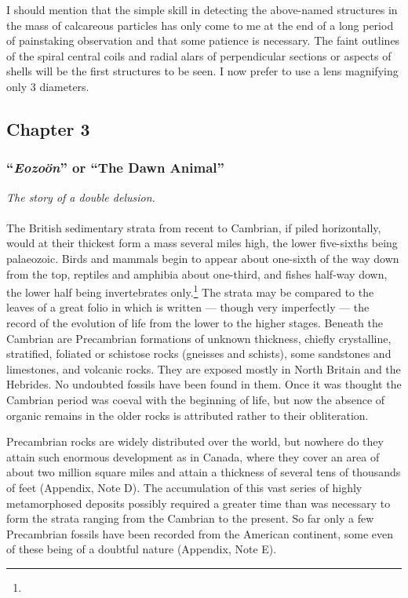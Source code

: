 \documentclass[a4paper, 12pt, oneside]{article}
\begin{document}
I should mention that the simple skill in detecting the above-named structures in the mass of calcareous particles has only come to me at the end of a long period of painstaking observation and that some patience is necessary. The faint outlines of the spiral central coils and radial alars of perpendicular sections or aspects of shells will be the first structures to be seen. I now prefer to use a lens magnifying only 3 diameters.
\clearpage
\subsection{Chapter 3}
\subsubsection{``\emph{Eozoön}'' or ``The Dawn Animal''}
\centerline{\emph{The story of a double delusion.}}
\paragraph{}
The British sedimentary strata from recent to Cambrian, if piled horizontally, would at their thickest form a mass several miles high, the lower five-sixths being palaeozoic. Birds and mammals begin to appear about one-sixth of the way down from the top, reptiles and amphibia about one-third, and fishes half-way down, the lower half being invertebrates only.\footnote{} The strata may be compared to the leaves of a great folio in which is written --- though very imperfectly --- the record of the evolution of life from the lower to the higher stages. Beneath the Cambrian are Precambrian formations of unknown thickness, chiefly crystalline, stratified, foliated or schistose rocks (gneisses and schists), some sandstones and limestones, and volcanic rocks. They are exposed mostly in North Britain and the Hebrides. No undoubted fossils have been found in them. Once it was thought the Cambrian period was coeval with the beginning of life, but now the absence of organic remains in the older rocks is attributed rather to their obliteration.

Precambrian rocks are widely distributed over the world, but nowhere do they attain such enormous development as in Canada, where they cover an area of about two million square miles and attain a thickness of several tens of thousands of feet (Appendix, Note D). The accumulation of this vast series of highly metamorphosed deposits possibly required a greater time than was necessary to form the strata ranging from the Cambrian to the present. So far only a few Precambrian fossils have been recorded from the American continent, some even of these being of a doubtful nature (Appendix, Note E).
\end{document}
